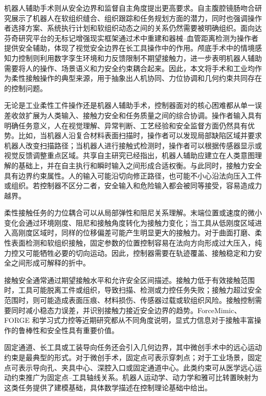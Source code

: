 机器人辅助手术则从安全边界和监督自主角度提出更高要求。自主腹腔镜肠吻合研究展示了机器人在软组织缝合、组织跟踪和任务规划方面的潜力，同时也强调操作者选择方案、系统执行计划和软组织动态之间的关系仍然需要被明确组织\cite{saeidi2022star}。面向达芬奇研究平台的无标记增强现实框架通过术中重建和器械--血管距离检测为操作者提供安全辅助，体现了视觉安全边界在长工具操作中的作用\cite{chen2023markerless}。颅底手术中的情境感知力控制则利用数字孪生环境和力反馈限制不期望接触力，进一步表明机器人辅助需要将人的操作、场景语义和力安全约束耦合起来\cite{ishida2024force,ishida2024haptic}。因此，本文将手术和工业均作为柔性接触操作的典型来源，用于抽象出人机协同、力位协调和几何约束共同存在的控制问题。

无论是工业柔性工件操作还是机器人辅助手术，控制器面对的核心困难都从单一误差收敛扩展为人类输入、接触力安全和任务质量之间的综合协调。操作者输入具有明确任务意义，人在视觉理解、异常判断、工艺经验和安全监督方面仍然具有优势。比如，当机器人沿复合材料表面扫描时，操作者可以发现局部缺陷区域并要求机器人改变扫描路径；当机器人进行接触式检测时，操作者可以根据传感器显示或视觉反馈调整重点区域。共享自主研究已经指出，机器人辅助应建立在人类意图理解的基础上，并在自主执行和瞬时输入之间形成合适权衡\cite{dragan2013policy,jain2020probabilistic,jonnavittula2021learning,jonnavittula2022sari}。与此同时，接触力安全具有边界约束属性。人的输入可能沿切向修正路径，也可能不小心沿法向压入工件或组织。若控制器不区分二者，安全输入和危险输入都会被同等接受，容易造成力越界。

柔性接触任务的力位耦合可以从局部弹性和阻尼关系理解。末端位置或速度的微小变化会通过环境刚度、阻尼和接触角度转化为接触力变化；当工具从低刚度区域进入高刚度区域时，同样的位移偏差可能产生明显更大的接触力。对于曲面打磨、柔性表面检测和软组织接触，固定参数的位置控制容易在法向方向形成过大压入，纯力控又可能牺牲必要的切向运动。因此，控制器需要在轨迹覆盖、接触稳定和力安全之间形成可解释的折中。

接触安全通常通过期望接触水平和允许安全区间描述。接触力低于有效接触范围时，工具可能脱离工件或组织，导致扫描、检测或力控任务失败；接触力超过安全范围时，则可能造成表面压痕、材料损伤、传感器过载或软组织风险。接触控制需要同时减小稳态力误差，并识别接触力接近安全边界的趋势。ForceMimic、FORGE 和学习式力控等近期研究都从不同角度说明，显式力信息对于接触丰富操作的鲁棒性和安全性具有重要价值\cite{beltran2020learning,liu2024forcemimic,noseworthy2024forge,portela2024learning}。

固定通道、长工具或工装导向任务还会引入几何边界，其中微创手术中的远心运动约束是最典型的形式。对于微创手术，固定点可表示穿刺点；对于工业场景，固定点可表示导向孔、夹具中心、深腔入口或固定通道中心。此类约束可从医学远心运动约束推广为固定点--工具轴线关系。机器人运动学、动力学和雅可比转置映射为这类任务提供了建模基础\cite{siciliano2016handbook,khatib1987operational}，具体数学描述在控制理论基础中给出。

